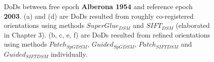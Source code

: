 \begin{figure}[htbp]
\begin{center}
{\begin{minipage}[t]{0.31\linewidth}
			\end{minipage}%
		}
		
		\caption{{\scriptsize \ac{DoD}s between free epoch \textbf{Alberona 1954} and reference epoch \textbf{2003}. (a) and (d) are \ac{DoD}s resulted from roughly co-registered orientations using methods $SuperGlue_{DSM}$ and $SIFT_{DSM}$ (elaborated in Chapter 3). (b, c, e, f) are \ac{DoD}s resulted from refined orientations using methods $Patch_{SpGDSM}$, $Guided_{SpGDSM}$, $Patch_{SIFTDSM}$ and $Guided_{SIFTDSM}$ individually.}}
		\label{PreciseDoDAlberona}
	\end{center}
\end{figure} 


